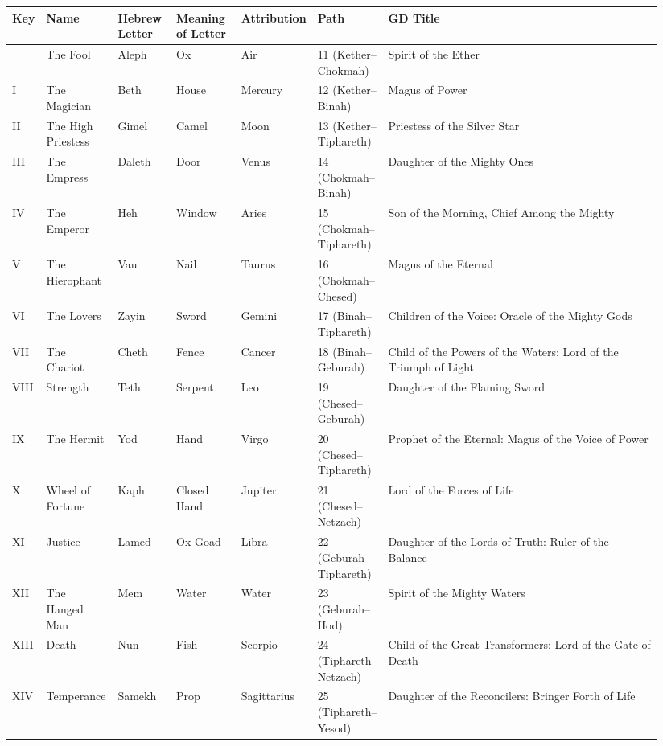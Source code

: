 \begin{longtable}[]{@{}>{\RaggedRight\small}p{0.05\linewidth}>{\RaggedRight\small}p{0.11\linewidth}>{\RaggedRight\small}p{0.09\linewidth}>{\RaggedRight\small}p{0.10\linewidth}>{\RaggedRight\small}p{0.09\linewidth}>{\RaggedRight\small}p{0.07\linewidth}>{\RaggedRight\small}p{0.43\linewidth}@{}}
\toprule\noalign{}
Key & Name & Hebrew Letter & Meaning of Letter & Attribution & Path & GD Title \\
\midrule\noalign{}
\endhead
\bottomrule\noalign{}
\endlastfoot
0 & The Fool & Aleph & Ox & Air & 11 (Kether--Chokmah) & Spirit of the Ether \\
I & The Magician & Beth & House & Mercury & 12 (Kether--Binah) & Magus of Power \\
II & The High Priestess & Gimel & Camel & Moon & 13 (Kether--Tiphareth) & Priestess of the Silver Star \\
III & The Empress & Daleth & Door & Venus & 14 (Chokmah--Binah) & Daughter of the Mighty Ones \\
IV & The Emperor & Heh & Window & Aries & 15 (Chokmah--Tiphareth) & Son of the Morning, Chief Among the Mighty \\
V & The Hierophant & Vau & Nail & Taurus & 16 (Chokmah--Chesed) & Magus of the Eternal \\
VI & The Lovers & Zayin & Sword & Gemini & 17 (Binah--Tiphareth) & Children of the Voice: Oracle of the Mighty Gods \\
VII & The Chariot & Cheth & Fence & Cancer & 18 (Binah--Geburah) & Child of the Powers of the Waters: Lord of the Triumph of Light \\
VIII & Strength & Teth & Serpent & Leo & 19 (Chesed--Geburah) & Daughter of the Flaming Sword \\
IX & The Hermit & Yod & Hand & Virgo & 20 (Chesed--Tiphareth) & Prophet of the Eternal: Magus of the Voice of Power \\
X & Wheel of Fortune & Kaph & Closed Hand & Jupiter & 21 (Chesed--Netzach) & Lord of the Forces of Life \\
XI & Justice & Lamed & Ox Goad & Libra & 22 (Geburah--Tiphareth) & Daughter of the Lords of Truth: Ruler of the Balance \\
XII & The Hanged Man & Mem & Water & Water & 23 (Geburah--Hod) & Spirit of the Mighty Waters \\
XIII & Death & Nun & Fish & Scorpio & 24 (Tiphareth--Netzach) & Child of the Great Transformers: Lord of the Gate of Death \\
XIV & Temperance & Samekh & Prop & Sagittarius & 25 (Tiphareth--Yesod) & Daughter of the Reconcilers: Bringer Forth of Life \\

\end{longtable}

